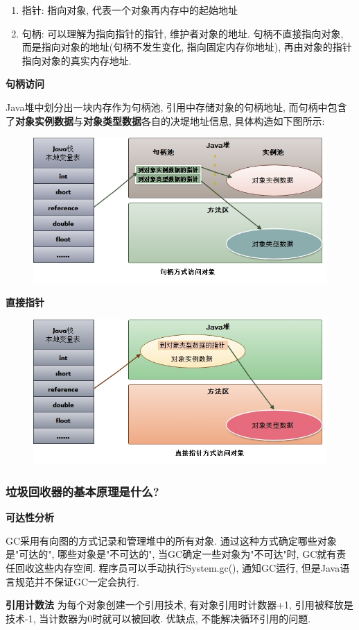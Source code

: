 \documentclass[UTF8]{ctexart}
\begin{document}
\begin{enumerate}
	\item 指针: 指向对象, 代表一个对象再内存中的起始地址
	\item 句柄: 可以理解为指向指针的指针, 维护者对象的地址. 句柄不直接指向对象, 而是指向对象的地址(句柄不发生变化, 指向固定内存你地址), 再由对象的指针指向对象的真实内存地址.
\end{enumerate}
\textbf{句柄访问}
\par
Java堆中划分出一块内存作为句柄池, 引用中存储对象的句柄地址, 而句柄中包含了\textbf{对象实例数据}与\textbf{对象类型数据}各自的决堤地址信息, 具体构造如下图所示:
\begin{figure}
	\centering
	\includegraphics[width=0.7\linewidth]{figures/jvm_handler.jpg}
	\caption{}
	\label{fig:jvm_handler}
\end{figure}
\textbf{直接指针}
\par
\begin{figure}
	\centering
	\includegraphics[width=0.7\linewidth]{figures/jvm_point.jpg}
	\caption{}
	\label{fig:jvm_point}
\end{figure}
\subsubsection{垃圾回收器的基本原理是什么?}
\textbf{可达性分析}
\par
GC采用有向图的方式记录和管理堆中的所有对象. 通过这种方式确定哪些对象是"可达的", 哪些对象是"不可达的", 当GC确定一些对象为"不可达"时, GC就有责任回收这些内存空间.
程序员可以手动执行System.gc(), 通知GC运行, 但是Java语言规范并不保证GC一定会执行.
\par
\textbf{引用计数法}
为每个对象创建一个引用技术, 有对象引用时计数器+1, 引用被释放是技术-1, 当计数器为0时就可以被回收. 优缺点, 不能解决循环引用的问题.
\end{document}
